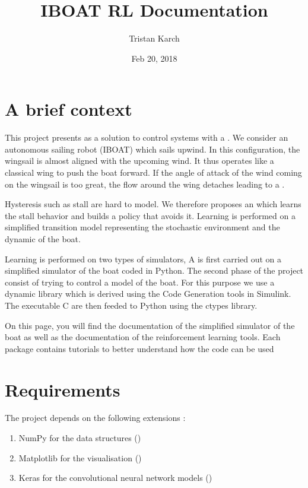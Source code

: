 \documentclass[letterpaper,10pt,english]{sphinxmanual}
\title{IBOAT RL Documentation}
\date{Feb 20, 2018}
\author{Tristan Karch}
\begin{document}
\maketitle
\sphinxtableofcontents
{}\label{\detokenize{index::doc}}



\chapter{A brief context}
\label{\detokenize{index:a-brief-context}}\label{\detokenize{index:welcome-to-iboat-rl-s-documentation}}
This project presents  as a solution to control systems with a . We consider an
autonomous sailing robot (IBOAT) which sails upwind. In this configuration, the wingsail is almost aligned with the upcoming wind. It thus operates like
a classical wing to push the boat forward. If the angle of attack of the wind coming on the wingsail is too great, the flow around the wing detaches leading to
a .

Hysteresis such as stall are hard to model. We therefore proposes an  which learns the stall behavior and
builds a policy that avoids it. Learning is performed on a simplified transition model representing the stochastic environment and the dynamic of the boat.

Learning is performed on two types of simulators, A  is first carried out on a simplified simulator of the boat coded in Python. The second phase of the project consist of trying to control a   model of the boat. For this purpose we use a dynamic library which is derived using the Code Generation tools in Simulink. The executable C are then feeded to Python using the \sphinxquotedblleft{}ctypes\sphinxquotedblright{} library.

On this page, you will find the documentation of the simplified simulator of the boat as well as the documentation of the reinforcement learning tools. Each package contains tutorials to better understand how the code can be used


\chapter{Requirements}
\label{\detokenize{index:requirements}}
The project depends on the following extensions :
\begin{enumerate}
\item {} 
NumPy for the data structures ()

\item {} 
Matplotlib for the visualisation ()

\item {} 
Keras for the convolutional neural network models ()

\end{enumerate}
\end{document}
